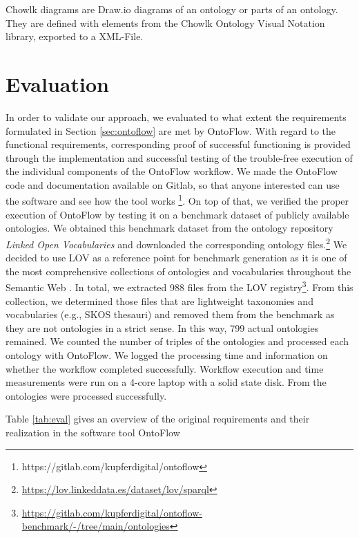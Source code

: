 \documentclass[sigconf]{acmart}
\begin{document}
Chowlk diagrams are Draw.io diagrams of an ontology or parts of an ontology.
They are defined with elements from the Chowlk Ontology Visual Notation library, exported to a XML-File.

\section{Evaluation}
In order to validate our approach, we evaluated to what extent the requirements formulated in Section \ref{sec:ontoflow} are met by OntoFlow. With regard to the functional requirements, corresponding proof of successful functioning is provided through the implementation and successful testing of the trouble-free execution of the individual components of the OntoFlow workflow. We made the OntoFlow code and documentation available on Gitlab, so that anyone interested can use the software and see how the tool works \footnote{https://gitlab.com/kupferdigital/ontoflow}. On top of that, we 
verified the proper execution of OntoFlow by testing it on a benchmark dataset of publicly available ontologies. We obtained this benchmark dataset from the ontology repository \textit{Linked Open Vocabularies} and downloaded the corresponding ontology files.\footnote{\url{https://lov.linkeddata.es/dataset/lov/sparql}} We decided to use LOV as a reference point for benchmark generation as it is one of the most comprehensive collections of ontologies and vocabularies throughout the Semantic Web \cite{lov}. In total, we extracted 988 files from the LOV registry\footnote{\url{https://gitlab.com/kupferdigital/ontoflow-benchmark/-/tree/main/ontologies}}. From this collection, we determined those files that are lightweight taxonomies and vocabularies (e.g., SKOS thesauri) and removed them from the benchmark as they are not ontologies in a strict sense. In this way, 799 actual ontologies remained. We counted the number of triples of the ontologies and processed each ontology with OntoFlow. We logged the processing time and information on whether the workflow completed successfully. Workflow execution and time measurements were run on a 4-core laptop with a solid state disk. From the  ontologies  were processed successfully.

Table \ref{tab:eval} gives an overview of the original requirements and their realization in the software tool OntoFlow
\end{document}
